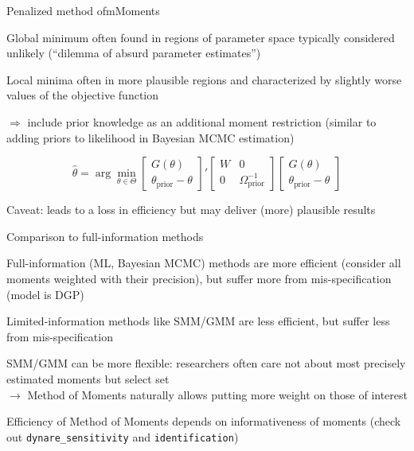 \begin{frame}{Penalized method ofmMoments}

  \begin{witemize}
    \item Global minimum often found in regions of parameter space typically considered unlikely (``dilemma of absurd parameter estimates'')
    \item Local minima often in more plausible regions and characterized by slightly worse values of the objective function

    $\Rightarrow$ include prior knowledge as an additional moment restriction (similar to adding priors to likelihood in Bayesian MCMC estimation)

    \begin{equation}
      \hat{\theta} = \arg\min_{\theta \in \Theta} \begin{bmatrix} G(\theta) \\ \theta_{\text{prior}} - \theta \end{bmatrix}'
      \begin{bmatrix} W & 0 \\ 0 & \Omega_{\text{prior}}^{-1} \end{bmatrix}
      \begin{bmatrix} G(\theta) \\ \theta_{\text{prior}} - \theta \end{bmatrix}
    \end{equation}
    \item Caveat: leads to a loss in efficiency but may deliver (more) plausible results
  \end{witemize}
\end{frame}


\begin{frame}{Comparison to full-information methods}

  \begin{witemize}
    \item Full-information (ML, Bayesian MCMC) methods are more efficient (consider all moments weighted with their precision), but suffer more from mis-specification (model is DGP)
    \item Limited-information methods like SMM/GMM are less efficient, but suffer less from mis-specification
    \item SMM/GMM can be more flexible: researchers often care not about most precisely estimated moments but select set\\
    $\rightarrow$ Method of Moments naturally allows putting more weight on those of interest
    \item Efficiency of Method of Moments depends on informativeness of moments (check out \texttt{dynare\_sensitivity} and \texttt{identification})
  \end{witemize}

\end{frame}

